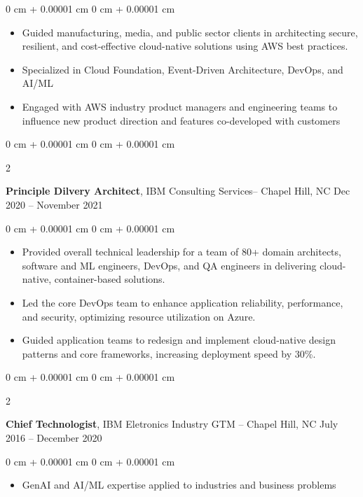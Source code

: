 \documentclass[10pt, letterpaper]{article}
\newenvironment{highlights}{
    \begin{itemize}[
        topsep=0.10 cm,
        parsep=0.10 cm,
        partopsep=0pt,
        itemsep=0pt,
        leftmargin=0 cm + 10pt
    ]
}{
    \end{itemize}
} %
\newenvironment{onecolentry}{
    \begin{adjustwidth}{
        0 cm + 0.00001 cm
    }{
        0 cm + 0.00001 cm
    }
}{
    \end{adjustwidth}
} %
\newenvironment{twocolentry}[2][]{
    \onecolentry
    \def\secondColumn{#2}
    \setcolumnwidth{\fill, 4.5 cm}
    \begin{paracol}{2}
}{
    \switchcolumn \raggedleft \secondColumn
    \end{paracol}
    \endonecolentry
} %
\begin{document}
        \vspace{0.10 cm}
        \begin{onecolentry}
            \begin{highlights}
                \item Guided manufacturing, media, and public sector clients in architecting secure, resilient, and cost-effective cloud-native solutions using AWS best practices.
                \item Specialized in Cloud Foundation, Event-Driven Architecture, DevOps, and AI/ML
                \item Engaged with AWS industry product managers and engineering teams to influence new product direction and features co-developed with customers
            \end{highlights}
        \end{onecolentry}
        
        \begin{twocolentry}{
            Dec 2020 – November 2021
        }
            \textbf{Principle Dilvery Architect}, IBM Consulting Services-- Chapel Hill, NC\end{twocolentry}

        \vspace{0.10 cm}
        \begin{onecolentry}
            \begin{highlights}
                \item Provided overall technical leadership for a team of 80+ domain architects, software and ML engineers, DevOps, and QA engineers in delivering cloud-native, container-based solutions.
                \item Led the core DevOps team to enhance application reliability, performance, and security, optimizing resource utilization on Azure.
                \item Guided application teams to redesign and implement cloud-native design patterns and core frameworks, increasing deployment speed by 30\%.
            \end{highlights}
        \end{onecolentry}
        
        \begin{twocolentry}{
            July 2016 – December 2020
        }
            \textbf{Chief Technologist}, IBM Eletronics Industry GTM -- Chapel Hill, NC\end{twocolentry}

        \vspace{0.10 cm}
        \begin{onecolentry}
            \begin{highlights}
                \item GenAI and AI/ML expertise applied to industries and business problems
            \end{highlights}
        \end{onecolentry}        
\end{document}
